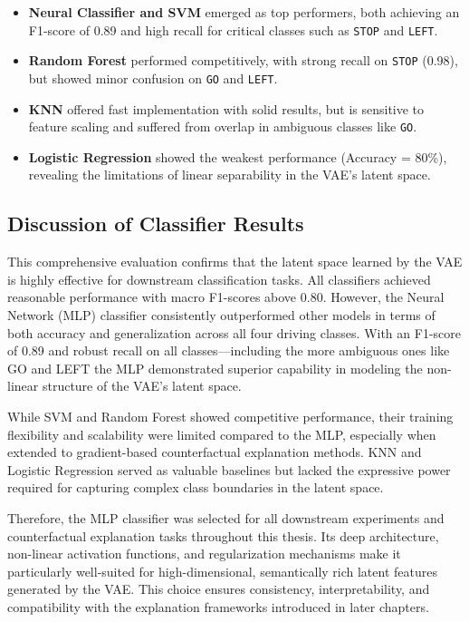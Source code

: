 \begin{itemize}
    \item \textbf{Neural Classifier and SVM} emerged as top performers, both achieving an F1-score of 0.89 and high recall for critical classes such as \texttt{STOP} and \texttt{LEFT}.
    \item \textbf{Random Forest} performed competitively, with strong recall on \texttt{STOP} (0.98), but showed minor confusion on \texttt{GO} and \texttt{LEFT}.
    \item \textbf{KNN} offered fast implementation with solid results, but is sensitive to feature scaling and suffered from overlap in ambiguous classes like \texttt{GO}.
    \item \textbf{Logistic Regression} showed the weakest performance (Accuracy = 80\%), revealing the limitations of linear separability in the VAE's latent space.
\end{itemize}

\subsection{Discussion of Classifier Results}

This comprehensive evaluation confirms that the latent space learned by the VAE is highly effective for downstream classification tasks. All classifiers achieved reasonable performance with macro F1-scores above 0.80. However, the Neural Network (MLP) classifier consistently outperformed other models in terms of both accuracy and generalization across all four driving classes. With an F1-score of 0.89 and robust recall on all classes—including the more ambiguous ones like GO and LEFT the MLP demonstrated superior capability in modeling the non-linear structure of the VAE's latent space.

While SVM and Random Forest showed competitive performance, their training flexibility and scalability were limited compared to the MLP, especially when extended to gradient-based counterfactual explanation methods. KNN and Logistic Regression served as valuable baselines but lacked the expressive power required for capturing complex class boundaries in the latent space.

Therefore, the MLP classifier was selected for all downstream experiments and counterfactual explanation tasks throughout this thesis. Its deep architecture, non-linear activation functions, and regularization mechanisms make it particularly well-suited for high-dimensional, semantically rich latent features generated by the VAE. This choice ensures consistency, interpretability, and compatibility with the explanation frameworks introduced in later chapters.

